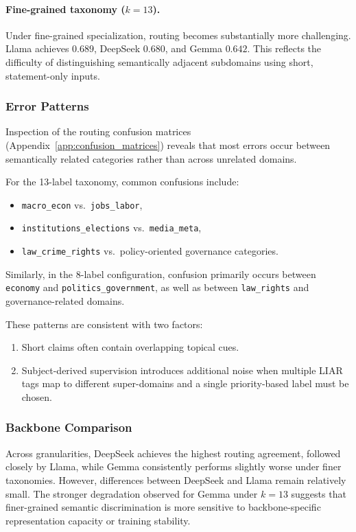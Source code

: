 \paragraph{Fine-grained taxonomy ($k=13$).}
Under fine-grained specialization, routing becomes substantially more challenging. Llama achieves $0.689$, DeepSeek $0.680$, and Gemma $0.642$. This reflects the difficulty of distinguishing semantically adjacent subdomains using short, statement-only inputs.

\subsubsection{Error Patterns}

Inspection of the routing confusion matrices (Appendix~\ref{app:confusion_matrices}) reveals that most errors occur between semantically related categories rather than across unrelated domains. 

For the 13-label taxonomy, common confusions include:
\begin{itemize}
    \item \texttt{macro\_econ} vs.\ \texttt{jobs\_labor},
    \item \texttt{institutions\_elections} vs.\ \texttt{media\_meta},
    \item \texttt{law\_crime\_rights} vs.\ policy-oriented governance categories.
\end{itemize}

Similarly, in the 8-label configuration, confusion primarily occurs between \texttt{economy} and \texttt{politics\_government}, as well as between \texttt{law\_rights} and governance-related domains. 

These patterns are consistent with two factors:
\begin{enumerate}
    \item Short claims often contain overlapping topical cues.
    \item Subject-derived supervision introduces additional noise when multiple LIAR tags map to different super-domains and a single priority-based label must be chosen.
\end{enumerate}

\subsubsection{Backbone Comparison}

Across granularities, DeepSeek achieves the highest routing agreement, followed closely by Llama, while Gemma consistently performs slightly worse under finer taxonomies. However, differences between DeepSeek and Llama remain relatively small. The stronger degradation observed for Gemma under $k=13$ suggests that finer-grained semantic discrimination is more sensitive to backbone-specific representation capacity or training stability.

